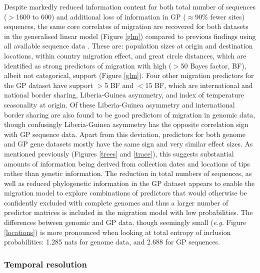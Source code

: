 \documentclass{bmcart}
\begin{document}
Despite markedly reduced information content for both total number of sequences ($>$1600 to 600) and additional loss of information in GP ($\approx$90\% fewer sites) sequences, the same core correlates of migration are recovered for both datasets in the generalised linear model (Figure \ref{glm}) compared to previous findings using all available sequence data \cite{dudas_virus_2017}.
These are: population sizes at origin and destination locations, within country migration effect, and great circle distances, which are identified as strong predictors of migration with high ($>$50 Bayes factor, BF), albeit not categorical, support (Figure \ref{glm}).
Four other migration predictors for the GP dataset have support $>$5 BF and $<$15 BF, which are international and national border sharing, Liberia-Guinea asymmetry, and index of temperature seasonality at origin.
Of these Liberia-Guinea asymmetry and international border sharing are also found to be good predictors of migration in genomic data, though confusingly Liberia-Guinea asymmetry has the opposite correlation sign with GP sequence data.
Apart from this deviation, predictors for both genome and GP gene datasets mostly have the same sign and very similar effect sizes.
As mentioned previously (Figures \ref{trees} and \ref{trace}), this suggests substantial amounts of information being derived from collection dates and locations of tips rather than genetic information.
The reduction in total numbers of sequences, as well as reduced phylogenetic information in the GP dataset appears to enable the migration model to explore combinations of predictors that would otherwise be confidently excluded with complete genomes and thus a larger number of predictor matrices is included in the migration model with low probabilities.
The differences between genomic and GP data, though seemingly small (\textit{e.g.} Figure \ref{locations}) is more pronounced when looking at total entropy of inclusion probabilities: 1.285 nats for genome data, and 2.688 for GP sequences.


\subsubsection*{Temporal resolution}
\end{document}
